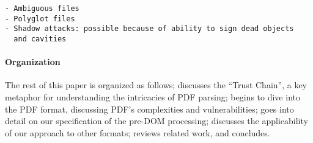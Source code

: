 \label{sec:pdf-vulnerabilities}
\begin{lstlisting}[style=meta]
- Ambiguous files
- Polyglot files
- Shadow attacks: possible because of ability to sign dead objects
  and cavities 
\end{lstlisting}

\paragraph*{Organization} The rest of this paper is organized as
follows;
%
 discusses the ``Trust Chain'', a key metaphor
for understanding the intricacies of PDF parsing;
 begins to dive into the PDF format, discussing PDF's
complexities and vulnerabilities;
 goes into detail on our specification of the pre-DOM processing;
 discusses the applicability of our approach to other formats;
%
 reviews related work, and %
 concludes.

